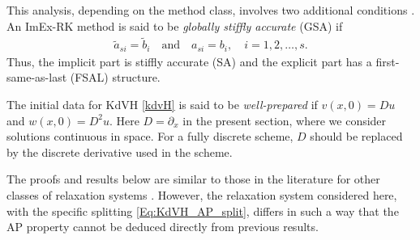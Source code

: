 \documentclass{article}
\begin{document}
This analysis, depending on the method class, involves two additional conditions \cite{boscarino2024asymptotic}.
 An ImEx-RK method is said to be \emph{globally stiffly accurate} (GSA) if
\begin{align}
\tilde{a}_{si} = \tilde{b}_{i} \quad \text{and} \quad a_{si} = b_{i}, \quad i = 1, 2, \dots, s.
\end{align}
Thus, the implicit part is stiffly accurate (SA) and the explicit part has a
first-same-as-last (FSAL) structure.

The initial data for KdVH \eqref{kdvH} is said to be \emph{well-prepared} if
$v(x,0) = Du$ and $w(x,0) = D^2u$.  Here $D=\partial_x$ in the present section,
where we consider solutions continuous in space.  For a fully discrete scheme,
$D$ should be replaced by the discrete derivative used in the scheme.

The proofs and results below are similar to those in the literature for
other classes of relaxation systems \cite{boscarino2024asymptotic}.
However, the relaxation system considered here, with the specific splitting
\eqref{Eq:KdVH_AP_split}, differs in such a way that the AP property cannot
be deduced directly from previous results.
\end{document}

